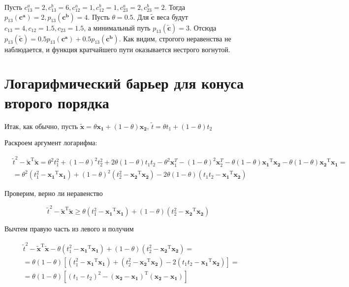 	Пусть $c_{13}^a = 2, c_{13}^b = 6, c_{12}^a = 1, c_{12}^b = 1, c_{23}^a = 2, c_{23}^b = 2$. Тогда $p_{13}(\mathbf{c^a}) = 2, p_{13}(\mathbf{c^b}) = 4$. Пусть $\theta = 0.5$. Для $\mathbf{\tilde{c}}$ веса будут $c_{13} = 4, c_{12} = 1.5, c_{23} = 1.5$, а минимальный путь $p_{13}(\mathbf{\tilde{c}}) = 3$. Отсюда $p_{13}(\mathbf{\tilde{c}}) = 0.5 p_{13}(\mathbf{c^a}) + 0.5 p_{13}(\mathbf{c^b}) $. Как видим, строгого неравенства не наблюдается, и функция кратчайшего пути оказывается нестрого вогнутой.
	
	\section{Логарифмический барьер для конуса второго порядка}
	
	Итак, как обычно, пусть $\mathbf{\tilde{x}} = \theta \mathbf{x_1} +  (1 - \theta) \mathbf{x_2}$, $\tilde{t} = \theta t_1 + (1 - \theta) t_2$
	
	Раскроем аргумент логарифма:
	
	\begin{equation}
	\begin{split}
	&\tilde{t}^2 - \mathbf{\tilde{x}}^\text{T} \mathbf{\tilde{x}} = \theta^2 t_1^2 + (1-\theta)^2 t_2^2 + 2\theta(1-\theta)t_1 t_2 - \theta^2 \mathbf{x}_1^{T} -(1- \theta)^2 \mathbf{x}_2^{T} - \theta (1- \theta)\mathbf{x_1}^\text{T} \mathbf{x_2} - \theta (1- \theta)\mathbf{x_2}^\text{T} \mathbf{x_1} = \\
	&=\theta^2(t_1^2 - \mathbf{x_1}^\text{T} \mathbf{x_1}) + (1-\theta)^2(t_2^2 - \mathbf{x_2}^\text{T} \mathbf{x_2}) - 2\theta (1-\theta)(t_1 t_2 - \mathbf{x_1}^\text{T} \mathbf{x_2})
	\end{split}
	\end{equation}
	
	Проверим, верно ли неравенство
	
	\begin{equation}
	\label{62}
	\tilde{t}^2 - \mathbf{\tilde{x}}^\text{T} \mathbf{\tilde{x}} \geqslant \theta (t_1^2 - \mathbf{x_1}^\text{T} \mathbf{x_1}) + (1-\theta)(t_2^2 - \mathbf{x_2}^\text{T} \mathbf{x_2})
	\end{equation}
	
	Вычтем правую часть из левого и получим
	
	
	
	\begin{equation}
	\begin{split}
	\label{63}
	&\tilde{t}^2 - \mathbf{\tilde{x}}^\text{T} \mathbf{\tilde{x}} - \theta (t_1^2 - \mathbf{x_1}^\text{T} \mathbf{x_1}) + (1-\theta)(t_2^2 - \mathbf{x_2}^\text{T} \mathbf{x_2}) = \\
	&= \theta(1-\theta) \left[ (t_1^2 - \mathbf{x_1}^\text{T} \mathbf{x_1}) + (t_2^2 - \mathbf{x_2}^\text{T} \mathbf{x_2}) - 2(t_1 t_2 - \mathbf{x_1}^\text{T} \mathbf{x_2})\right] = \\
	&=\theta(1-\theta) \left[ (t_1-t_2)^2 - (\mathbf{x_2} - \mathbf{x_1})^\text{T}(\mathbf{x_2} - \mathbf{x_1})\right] 
	\end{split}
	\end{equation}
	
